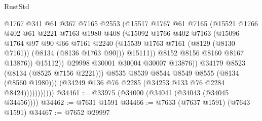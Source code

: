 \begin{lexlean}{RustStd}
\begin{coremodule}
                                  @1767
                                  @341
                                  @61
                                  @367
                                  @7165
                                  @2553
                                  (@15517
                                    @1767
                                    @61
                                    @7165
                                    (@15521
                                      @1766
                                      @402
                                      @61
                                      @2221
                                      @7163
                                      @1980
                                      @408
                                      (@15092
                                        @1766
                                        @402
                                        @7163
                                        (@15096
                                          @1764
                                          @97
                                          @90
                                          @66
                                          @7161
                                          @2240
                                          (@15539
                                            @1763
                                            @7161
                                            (@8129 (@8130 @7161))
                                            (@8134 (@8136 @1763 @90)))
                                          @15111))
                                      @8152
                                      @8156
                                      @8160
                                      @8167
                                      @13876))
                                  @15112))
                              @29998
                              @30001
                              @30004
                              @30007
                              @13876))
                          @34179
                          @8523
                          (@8134 (@8525 @7156 @2221)))
                        @8535
                        @8539
                        @8544
                        @8549
                        @8555
                        (@8134 (@8560 @1980)))
                      (@34249 @136 @76 @2285 (@34253 @133 @76 @2284 @8424)))))))))))
@34461 := @33975 (@34000 (@34041 (@34043 (@34045 @34456))))
@34462 := @7631 @1591
@34466 := @7633 (@7637 @1591) (@7643 @1591)
@34467 := @7652 @29997

\end{coremodule}
\end{lexlean}
